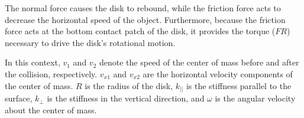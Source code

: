 \documentclass[11pt,letterpaper]{article}
\begin{document}
\noindent The normal force causes the disk to rebound, while the friction force acts to decrease the horizontal speed of the object. Furthermore, because the friction force acts at the bottom contact patch of the disk, it provides the torque ($FR$) necessary to drive the disk's rotational motion.

\noindent In this context, $v_1$ and $v_2$ denote the speed of the center of mass before and after the collision, respectively. $v_{x1}$ and $v_{x2}$ are the horizontal velocity components of the center of mass. $R$ is the radius of the disk, $k_{||}$ is the stiffness parallel to the surface, $k_{\perp}$ is the stiffness in the vertical direction, and $\omega$ is the angular velocity about the center of mass.

\begin{figure}[h!]
\centering
{}
\end{figure}
\end{document}
